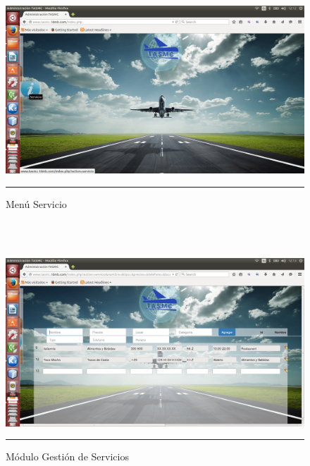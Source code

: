 \begin{figure}[h!]
	\centering
		\includegraphics[width=1\textwidth]{Figuras/indexServicio.png}
		\rule{35em}{0.5pt}
	\caption[Menú Servicio]{Menú Servicio}
	\label{fig:menuServicio}
\end{figure}
\\
\\
\begin{figure}[h!]
	\centering
		\includegraphics[width=1\textwidth]{Figuras/servicioswb.png}
		\rule{35em}{0.5pt}
	\caption[Módulo Gestión de Servicios]{Módulo Gestión de Servicios}
	\label{fig:moduloUsuarios}
\end{figure}
\clearpage

